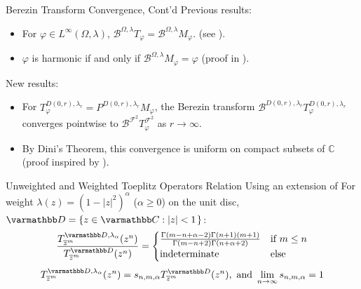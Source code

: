 \documentclass{reu_beamer}
\begin{document}
\begin{frame}{Berezin Transform Convergence, Cont'd}
 Previous results:
\begin{itemize}
    \item For $\varphi \in L^{\infty}(\Omega,\lambda)$, $\mathcal{B}^{\Omega,\lambda}T_{\varphi} = \mathcal{B}^{\Omega,\lambda}M_\varphi$. (see \cite{AxlerZhengToeplitzOperators}).
    \item $\varphi$ is harmonic if and only if $\mathcal{B}^{\Omega,\lambda} M_\varphi = \varphi$  (proof in \cite{EnglisHarmonicFunctions}).
\end{itemize}
\vspace{10pt}
New results:
\begin{itemize}
    \item For $T^{D(0,r), \lambda_r}_{\varphi} = P^{D(0,r), \lambda_r}M_{\varphi}$, the Berezin transform $\mathcal{B}^{D(0,r), \lambda_r}T^{D(0,r), \lambda_r}_\varphi$ converges pointwise to $\mathcal{B}^{\mathcal{F}^2}T^{\mathcal{F}^2}_{\varphi}$ as $r\rightarrow\infty$.
    \item By Dini's Theorem, this convergence is uniform on compact subsets of $\mathbb{C}$ (proof inspired by \cite{SahutogluGogus2020}).
\end{itemize}
\end{frame}
\begin{frame}{Unweighted and Weighted Toeplitz Operators Relation}
    Using an extension of \cite[Lemma 2.1]{AshleyAdenCelikDanielLuke2024}
    \newline\newline
    For weight $\lambda(z)=\left(1-|z|^2\right)^\alpha$ ($\alpha \geq 0$) on the unit disc, \(\mathbb{D} = \crl{z \in \C: \left |z| < 1\right.}\):
        \[
        \frac{T^{\disc, \lambda_\alpha}_{\overline{z}^m}(z^n)}{T^{\mathbb{D}}_{\overline{z}^m}(z^n)} =
        \begin{cases}
            \frac{\Gamma(m-n+\alpha-2)\Gamma(n+1)(m+1)}{\Gamma(m-n+2)\Gamma(n+\alpha+2)}&\text{if}\ m \leq n \\
            \text{indeterminate} &\text{else}
        \end{cases}
    \] 
    \newline
    \[T^{\disc, \lambda_\alpha}_{\overline{z}^m}(z^n)=s_{n,m,\alpha}T^{\disc}_{\overline{z}^m}(z^n),\text{ and }\limit{n}{\infty}s_{n,m,\alpha}=1\]
\end{frame}
\end{document}
